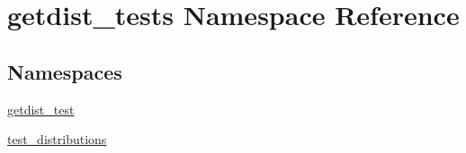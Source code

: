 \hypertarget{namespacegetdist__tests}{}\section{getdist\+\_\+tests Namespace Reference}
\label{namespacegetdist__tests}
\subsection*{Namespaces}
\begin{DoxyCompactItemize}
\item 
 \mbox{\hyperlink{namespacegetdist__tests_1_1getdist__test}{getdist\+\_\+test}}
\item 
 \mbox{\hyperlink{namespacegetdist__tests_1_1test__distributions}{test\+\_\+distributions}}
\end{DoxyCompactItemize}
